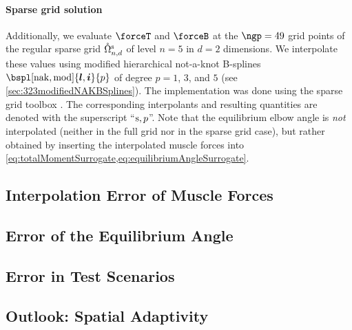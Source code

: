 \paragraph{Sparse grid solution}

Additionally, we evaluate $\forceT$ and $\forceB$ at the $\ngp = 49$
grid points of the regular sparse grid $\interiorregsgset{n}{d}$ of
level $n = 5$ in $d = 2$ dimensions.
We interpolate these values using
modified hierarchical not-a-knot B-splines
$\bspl[\nak,\modified]{\*l,\*i}{p}$ of degree $p = 1$, $3$, and $5$
(see \cref{sec:323modifiedNAKBSplines}).
The implementation was done using the sparse grid toolbox
\sgpp{} \cite{Pflueger10Spatially}.
The corresponding interpolants and resulting quantities
are denoted with the superscript ``$\mathrm{s},p$''.
Note that the equilibrium elbow angle is \emph{not} interpolated
(neither in the full grid nor in the sparse grid case),
but rather obtained by inserting the interpolated muscle forces
into \cref{eq:totalMomentSurrogate,eq:equilibriumAngleSurrogate}.



\subsection{Interpolation Error of Muscle Forces}
\label{sec:732forceInterpolation}

\dummytext[3]{}



\subsection{Error of the Equilibrium Angle}
\label{sec:733equilbriumAngle}

\dummytext[3]{}



\subsection{Error in Test Scenarios}
\label{sec:734scenarios}

\dummytext[3]{}



\subsection{Outlook: Spatial Adaptivity}
\label{sec:735adaptivity}

\dummytext[3]{}
